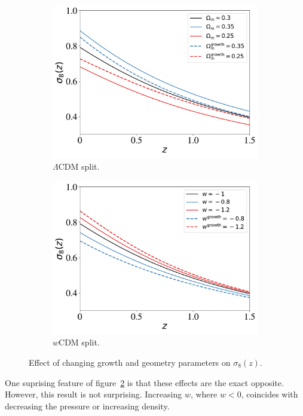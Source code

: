 \begin{figure}[ht]
	\centering
	\begin{subfigure}[b]{0.45\textwidth}
		\includegraphics[width=\textwidth]{plots/sigma8.pdf}
		\caption{$\Lambda$CDM split.}
		\label{fig:sigma8_l}
	\end{subfigure}
	\begin{subfigure}[b]{0.45\textwidth}
		\includegraphics[width=\textwidth]{plots/sigma8_w.pdf}
		\caption{$w$CDM split.}
		\label{fig:sigma8_w}
	\end{subfigure}
	\label{fig:sigma8}
	\caption{Effect of changing growth and geometry parameters on $\sigma_8(z)$.}
\end{figure}
One suprising feature of figure~\ref{fig:sigma8_w} is that these effects are the exact opposite. However, this result is not surprising. Increasing $w$, where $w<0$, coincides with decreasing the pressure or increasing density.
